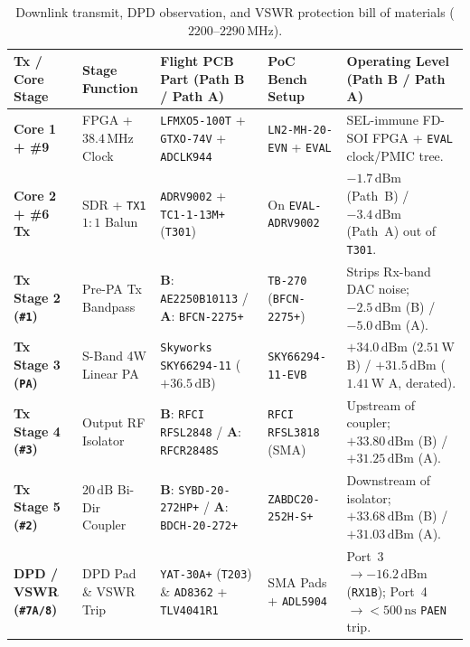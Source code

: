 \documentclass[10pt,a4paper]{article}
\renewcommand{\_}{\origunderscore\penalty0\hskip0pt\relax}
\numberwithin{table}{section}
\numberwithin{figure}{section}
\numberwithin{equation}{section}
\begin{document}
\begin{table}[htbp]
\centering
\scriptsize
\renewcommand{\arraystretch}{1.12}
\begin{tabularx}{\textwidth}{@{}L{0.92in}L{1.38in}L{1.72in}L{1.18in}Y@{}}
\toprule
\textbf{Tx / Core Stage} & \textbf{Stage Function} & \textbf{Flight PCB Part (Path B / Path A)} & \textbf{PoC Bench Setup} & \textbf{Operating Level (Path B / Path A)} \\
\midrule
\textbf{Core 1 + \#9} & FPGA + $38.4\,\text{MHz}$ Clock & \texttt{LFMXO5-100T} + \texttt{GTXO-74V} + \texttt{ADCLK944} & \texttt{LN2-MH-20-EVN} + \texttt{EVAL} & SEL-immune FD-SOI FPGA + \texttt{EVAL} clock/PMIC tree. \\
\textbf{Core 2 + \#6 Tx} & SDR + \texttt{TX1} $1:1$ Balun & \texttt{ADRV9002} + \texttt{TC1-1-13M+} (\texttt{T301}) & On \texttt{EVAL-ADRV9002} & $-1.7\,\text{dBm}$ (Path~B) / $-3.4\,\text{dBm}$ (Path~A) out of \texttt{T301}. \\
\textbf{Tx Stage 2 (\texttt{\#1})} & Pre-PA Tx Bandpass & \textbf{B}: \texttt{AE2250B10113} / \textbf{A}: \texttt{BFCN-2275+} & \texttt{TB-270} (\texttt{BFCN-2275+}) & Strips Rx-band DAC noise; $-2.5\,\text{dBm}$ (B) / $-5.0\,\text{dBm}$ (A). \\
\textbf{Tx Stage 3 (\texttt{PA})} & S-Band 4W Linear PA & \texttt{Skyworks SKY66294-11} ($+36.5\,\text{dB}$) & \texttt{SKY66294-11-EVB} & $+34.0\,\text{dBm}$ ($2.51\,\text{W}$ B) / $+31.5\,\text{dBm}$ ($1.41\,\text{W}$ A, derated). \\
\textbf{Tx Stage 4 (\texttt{\#3})} & Output RF Isolator & \textbf{B}: \texttt{RFCI RFSL2848} / \textbf{A}: \texttt{RFCR2848S} & \texttt{RFCI RFSL3818} (SMA) & Upstream of coupler; $+33.80\,\text{dBm}$ (B) / $+31.25\,\text{dBm}$ (A). \\
\textbf{Tx Stage 5 (\texttt{\#2})} & $20\,\text{dB}$ Bi-Dir Coupler & \textbf{B}: \texttt{SYBD-20-272HP+} / \textbf{A}: \texttt{BDCH-20-272+} & \texttt{ZABDC20-252H-S+} & Downstream of isolator; $+33.68\,\text{dBm}$ (B) / $+31.03\,\text{dBm}$ (A). \\
\textbf{DPD / VSWR (\texttt{\#7A/8})} & DPD Pad \& VSWR Trip & \texttt{YAT-30A+} (\texttt{T203}) \& \texttt{AD8362} + \texttt{TLV4041R1} & SMA Pads + \texttt{ADL5904} & Port~3 $\to -16.2\,\text{dBm}$ (\texttt{RX1B}); Port~4 $\to <500\,\text{ns}$ \texttt{PAEN} trip. \\
\bottomrule
\end{tabularx}
\caption{\footnotesize Downlink transmit, DPD observation, and VSWR protection bill of materials ($2200\text{--}2290\,\text{MHz}$).}
\end{table}
\end{document}
